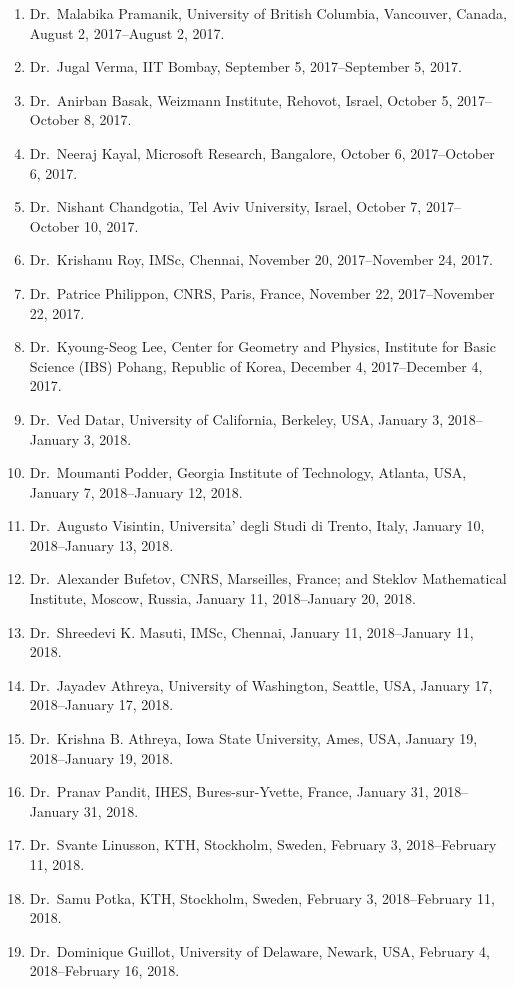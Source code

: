 \begin{enumerate}
\item Dr.~Malabika Pramanik, University of British Columbia, Vancouver, Canada, August 2, 2017--August 2, 2017.
\item Dr.~Jugal Verma, IIT Bombay, September 5, 2017--September 5, 2017.
\item Dr.~Anirban Basak, Weizmann Institute, Rehovot, Israel, October 5, 2017--October 8, 2017.
\item Dr.~Neeraj Kayal, Microsoft Research, Bangalore, October 6, 2017--October 6, 2017.
\item Dr.~Nishant Chandgotia, Tel Aviv University, Israel, October 7, 2017--October 10, 2017.
\item Dr.~Krishanu Roy, IMSc, Chennai, November 20, 2017--November 24, 2017.
\item Dr.~Patrice Philippon, CNRS, Paris, France, November 22, 2017--November 22, 2017.
\item Dr.~Kyoung-Seog Lee, Center for Geometry and Physics, Institute for Basic Science (IBS) Pohang, Republic of Korea, December 4, 2017--December 4, 2017.
\item Dr.~Ved Datar, University of California, Berkeley, USA, January 3, 2018--January 3, 2018.
\item Dr.~Moumanti Podder, Georgia Institute of Technology, Atlanta, USA, January 7, 2018--January 12, 2018.
\item Dr.~Augusto Visintin, Universita' degli Studi di Trento, Italy, January 10, 2018--January 13, 2018.
\item Dr.~Alexander Bufetov, CNRS, Marseilles, France; and Steklov Mathematical Institute, Moscow, Russia, January 11, 2018--January 20, 2018.
\item Dr.~Shreedevi K. Masuti, IMSc, Chennai, January 11, 2018--January 11, 2018.
\item Dr.~Jayadev Athreya, University of Washington, Seattle, USA, January 17, 2018--January 17, 2018.
\item Dr.~Krishna B. Athreya, Iowa State University, Ames, USA, January 19, 2018--January 19, 2018.
\item Dr.~Pranav Pandit, IHES, Bures-sur-Yvette, France, January 31, 2018--January 31, 2018.
\item Dr.~Svante Linusson, KTH, Stockholm, Sweden, February 3, 2018--February 11, 2018.
\item Dr.~Samu Potka, KTH, Stockholm, Sweden, February 3, 2018--February 11, 2018.
\item Dr.~Dominique Guillot, University of Delaware, Newark, USA, February 4, 2018--February 16, 2018.

\end{enumerate}
